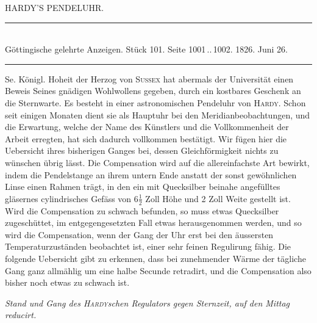 \clearpage
{}
\hypertarget{native-458-hardy}{}
\begin{center}{\large HARDY’S PENDELUHR.}\end{center}

\begin{center}
\rule{0.55\linewidth}{0.4pt}\\[2pt]
Göttingische gelehrte Anzeigen. Stück 101. Seite 1001\,..\,1002. 1826. Juni 26.\\[2pt]
\rule{0.55\linewidth}{0.4pt}
\end{center}

Se. Königl. Hoheit der Herzog von \textsc{Sussex} hat abermals der Universität einen Beweis
Seines gnädigen Wohlwollens gegeben, durch ein kostbares Geschenk an die Sternwarte.
Es besteht in einer astronomischen Pendeluhr von \textsc{Hardy}. Schon seit einigen Monaten
dient sie als Hauptuhr bei den Meridianbeobachtungen, und die Erwartung, welche der
Name des Künstlers und die Vollkommenheit der Arbeit erregten, hat sich dadurch
vollkommen bestätigt. Wir fügen hier die Uebersicht ihres bisherigen Ganges bei, dessen
Gleichförmigkeit nichts zu wünschen übrig lässt. Die Compensation wird auf
die allereinfachste Art bewirkt, indem die Pendelstange an ihrem untern Ende anstatt der
sonst gewöhnlichen Linse einen Rahmen trägt, in den ein mit Quecksilber beinahe
angefülltes gläsernes cylindrisches Gefäss von $6\frac{1}{2}$ Zoll Höhe und 2 Zoll Weite gestellt
ist. Wird die Compensation zu schwach befunden, so muss etwas Quecksilber
zugeschüttet, im entgegengesetzten Fall etwas herausgenommen werden, und so wird die
Compensation, wenn der Gang der Uhr erst bei den äussersten Temperaturzuständen
beobachtet ist, einer sehr feinen Regulirung fähig. Die folgende Uebersicht gibt zu
erkennen, dass bei zunehmender Wärme der tägliche Gang ganz allmählig um eine halbe
Secunde retradirt,
 und die Compensation also bisher noch etwas zu schwach ist.

\begin{center}
\emph{Stand und Gang des \textup{\textsc{Hardy}}schen Regulators gegen Sternzeit, auf den Mittag reducirt.}
\end{center}

